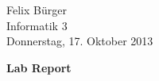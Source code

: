 \documentclass[parskip=full]{scrartcl}
\begin{document}
Felix Bürger\\
Informatik 3\\
Donnerstag, 17. Oktober 2013

\Huge\textbf{Lab Report}

\doublespacing
\normalsize

\lipsum[1]

\lipsum[2]
\end{document}
